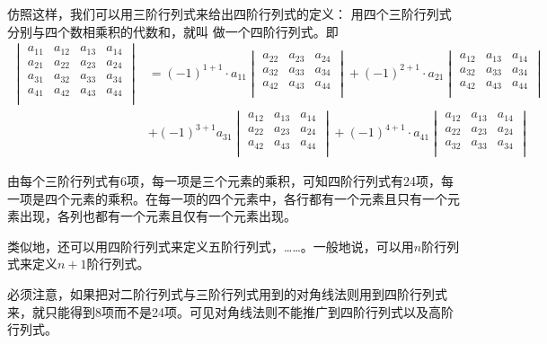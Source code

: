 仿照这样，我们可以用三阶行列式来给出四阶行列式的定义：
用四个三阶行列式分别与四个数相乘积的代数和，就叫
做一个四阶行列式。即
\[\begin{split}
    \begin{vmatrix}
       a_{11}&a_{12}&a_{13}&a_{14}\\
    a_{21}&a_{22}&a_{23}&a_{24}\\
    a_{31}&a_{32}&a_{33}&a_{34}\\
    a_{41}&a_{42}&a_{43}&a_{44}\\
    \end{vmatrix}&=(-1)^{1+1}\cdot a_{11}\begin{vmatrix}
        a_{22}&a_{23}&a_{24}\\
        a_{32}&a_{33}&a_{34}\\
        a_{42}&a_{43}&a_{44}\\
    \end{vmatrix}+(-1)^{2+1}\cdot a_{21}\begin{vmatrix}
        a_{12}&a_{13}&a_{14}\\
        a_{32}&a_{33}&a_{34}\\
        a_{42}&a_{43}&a_{44}\\
    \end{vmatrix}\\
    & +(-1)^{3+1}a_{31}\begin{vmatrix}
        a_{12}&a_{13}&a_{14}\\
        a_{22}&a_{23}&a_{24}\\
        a_{42}&a_{43}&a_{44}\\
    \end{vmatrix}
    +(-1)^{4+1}\cdot a_{41}\begin{vmatrix}
        a_{12}&a_{13}&a_{14}\\
        a_{22}&a_{23}&a_{24}\\
        a_{32}&a_{33}&a_{34}\\
    \end{vmatrix}
    \end{split}\]

由每个三阶行列式有6项，每一项是三个元素的乘积，可知四阶行列式有24项，每一项是四个元素的乘积。在每一项的四个元素中，各行都有一个元素且只有一个元素出现，各列也都有一个元素且仅有一个元素出现。

类似地，还可以用四阶行列式来定义五阶行列式，……。一般地说，可以用$n$阶行列式来定义$n+1$阶行列式。

必须注意，如果把对二阶行列式与三阶行列式用到的对角线法则用到四阶行列式来，就只能得到8项而不是24项。可见对角线法则不能推广到四阶行列式以及高阶行列式。

